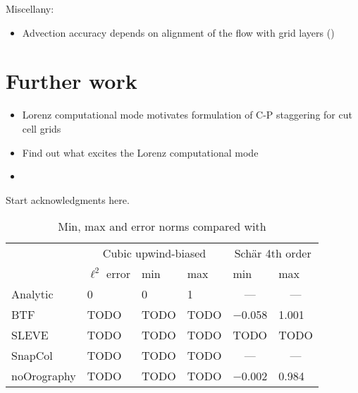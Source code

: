 \documentclass[twocol]{ametsoc}
\begin{document}
Miscellany:
\begin{itemize}
	\item Advection accuracy depends on alignment of the flow with grid layers ()
\end{itemize}

\section{Further work}
\begin{itemize}
	\item Lorenz computational mode motivates formulation of C-P staggering for cut cell grids
	\item Find out what excites the Lorenz computational mode
	\item {}
\end{itemize}

\acknowledgments
Start acknowledgments here.






\begin{table}[t]
\caption{Min, max and error norms compared with \citet{schaer2002}}
\label{tab:advection}
%
\begin{center}
\begin{tabular}{ l l l l l l }
\hline\hline
& \multicolumn{3}{c}{Cubic upwind-biased} & \multicolumn{2}{c}{Sch\"ar 4th order} \\
& $\ell^2$ error & min & max & min & max \\
\hline
Analytic  & 0 & 0 & 1 & \multicolumn{1}{c}{---} & \multicolumn{1}{c}{---} \\
BTF 	  & TODO & TODO & TODO & \num{-0.058} & \num{1.001} \\
SLEVE 	  & TODO & TODO & TODO & TODO & TODO \\
SnapCol   & TODO & TODO & TODO & \multicolumn{1}{c}{---} & \multicolumn{1}{c}{---} \\
noOrography & TODO & TODO & TODO & \num{-0.002} & \num{0.984} \\
\hline
\end{tabular}
\end{center}
\end{table}

\end{document}
